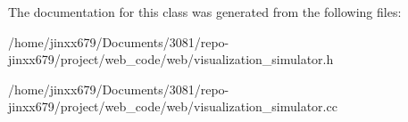 The documentation for this class was generated from the following files\+:\begin{DoxyCompactItemize}
\item 
/home/jinxx679/\+Documents/3081/repo-\/jinxx679/project/web\+\_\+code/web/visualization\+\_\+simulator.\+h\item 
/home/jinxx679/\+Documents/3081/repo-\/jinxx679/project/web\+\_\+code/web/visualization\+\_\+simulator.\+cc\end{DoxyCompactItemize}
